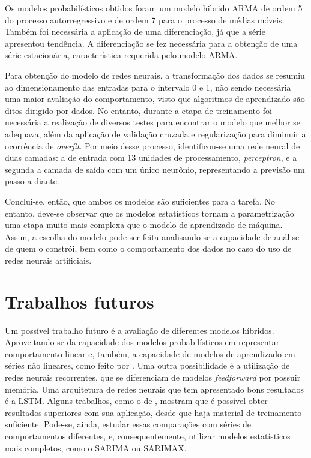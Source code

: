 \documentclass[
    12pt,
    oneside,
    a4paper,
    english,
    brazil
]{abntex2}
\begin{document}
Os modelos probabilísticos  obtidos foram um modelo hibrido ARMA  de ordem 5 do
processo autorregressivo e de ordem 7  para o processo de médias móveis. Também
foi necessária  a aplicação  de uma  diferenciação, já  que a  série apresentou
tendência.  A diferenciação  se fez  necessária para  a obtenção  de uma  série
estacionária, característica requerida pelo modelo ARMA\@.

Para obtenção do modelo de redes  neurais, a transformação dos dados se resumiu
ao dimensionamento  das entradas para o  intervalo 0 e 1,  não sendo necessária
uma maior avaliação  do comportamento, visto que algoritmos  de aprendizado são
ditos  dirigido por  dados.  No entanto,  durante a  etapa  de treinamento  foi
necessária  a  realização  de  diversos  testes para  encontrar  o  modelo  que
melhor  se adequava,  além da  aplicação de  validação cruzada  e regularização
para  diminuir  a ocorrência  de  \textit{overfit}.  Por meio  desse  processo,
identificou-se uma rede neural de duas camadas: a de entrada com 13 unidades de
processamento, \textit{perceptron}, e a segunda a  camada de saída com um único
neurônio, representando a previsão um passo a diante.

Conclui-se,  então, que  ambos os  modelos são  suficientes para  a tarefa.  No
entanto, deve-se observar  que os modelos estatísticos  tornam a parametrização
uma etapa muito mais complexa que o  modelo de aprendizado de máquina. Assim, a
escolha do modelo pode ser feita  analisando-se a capacidade de análise de quem
o constrói, bem como o comportamento dos  dados no caso do uso de redes neurais
artificiais.

\section{Trabalhos futuros}

Um  possível trabalho  futuro é  a  avaliação de  diferentes modelos  híbridos.
Aproveitando-se  da  capacidade  dos  modelos  probabilísticos  em  representar
comportamento  linear  e,  também,  a  capacidade  de  modelos  de  aprendizado
em  séries não  lineares, como  feito por  .
Uma  outra possibilidade  é  a  utilização de  redes  neurais recorrentes,  que
se  diferenciam  de  modelos  \textit{feedforward}  por  possuir  memória.  Uma
arquitetura de  redes neurais  que tem  apresentado bons  resultados é  a LSTM.
Alguns trabalhos, como o de , mostram
que é  possível obter resultados superiores  com sua aplicação, desde  que haja
material de  treinamento suficiente. Pode-se, ainda,  estudar essas comparações
com séries de comportamentos  diferentes, e, consequentemente, utilizar modelos
estatísticos mais completos, como o SARIMA ou SARIMAX\@.

\postextual


\end{document}
